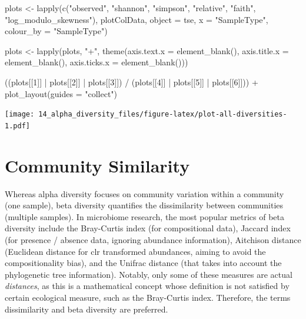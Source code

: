 \documentclass[
]{book}
\newenvironment{Shaded}{\begin{snugshade}}{\end{snugshade}}
\newcommand{\AttributeTok}[1]{\textcolor[rgb]{0.77,0.63,0.00}{#1}}
\newcommand{\DecValTok}[1]{\textcolor[rgb]{0.00,0.00,0.81}{#1}}
\newcommand{\FunctionTok}[1]{\textcolor[rgb]{0.00,0.00,0.00}{#1}}
\newcommand{\NormalTok}[1]{#1}
\newcommand{\OtherTok}[1]{\textcolor[rgb]{0.56,0.35,0.01}{#1}}
\newcommand{\SpecialCharTok}[1]{\textcolor[rgb]{0.00,0.00,0.00}{#1}}
\newcommand{\StringTok}[1]{\textcolor[rgb]{0.31,0.60,0.02}{#1}}
\begin{document}
\begin{Shaded}
\begin{Highlighting}[]
\NormalTok{plots }\OtherTok{\textless{}{-}} \FunctionTok{lapply}\NormalTok{(}\FunctionTok{c}\NormalTok{(}\StringTok{"observed"}\NormalTok{, }\StringTok{"shannon"}\NormalTok{, }\StringTok{"simpson"}\NormalTok{, }\StringTok{"relative"}\NormalTok{, }\StringTok{"faith"}\NormalTok{, }\StringTok{"log\_modulo\_skewness"}\NormalTok{),}
\NormalTok{                plotColData,}
                \AttributeTok{object =}\NormalTok{ tse,}
                \AttributeTok{x =} \StringTok{"SampleType"}\NormalTok{,}
                \AttributeTok{colour\_by =} \StringTok{"SampleType"}\NormalTok{)}

\NormalTok{plots }\OtherTok{\textless{}{-}} \FunctionTok{lapply}\NormalTok{(plots, }\StringTok{"+"}\NormalTok{, }
                \FunctionTok{theme}\NormalTok{(}\AttributeTok{axis.text.x =} \FunctionTok{element\_blank}\NormalTok{(),}
                      \AttributeTok{axis.title.x =} \FunctionTok{element\_blank}\NormalTok{(),}
                      \AttributeTok{axis.ticks.x =} \FunctionTok{element\_blank}\NormalTok{()))}

\NormalTok{((plots[[}\DecValTok{1}\NormalTok{]] }\SpecialCharTok{|}\NormalTok{ plots[[}\DecValTok{2}\NormalTok{]] }\SpecialCharTok{|}\NormalTok{ plots[[}\DecValTok{3}\NormalTok{]]) }\SpecialCharTok{/} 
\NormalTok{(plots[[}\DecValTok{4}\NormalTok{]] }\SpecialCharTok{|}\NormalTok{ plots[[}\DecValTok{5}\NormalTok{]] }\SpecialCharTok{|}\NormalTok{ plots[[}\DecValTok{6}\NormalTok{]])) }\SpecialCharTok{+}
  \FunctionTok{plot\_layout}\NormalTok{(}\AttributeTok{guides =} \StringTok{"collect"}\NormalTok{)}
\end{Highlighting}
\end{Shaded}

\texttt{[image: 14\_alpha\_diversity\_files/figure-latex/plot-all-diversities-1.pdf]}

\hypertarget{community-similarity}{%
\chapter{Community Similarity}\label{community-similarity}}

Whereas alpha diversity focuses on community variation within a community
(one sample), beta diversity quantifies the dissimilarity between communities
(multiple samples). In microbiome research, the most popular metrics of beta
diversity include the Bray-Curtis index (for compositional data), Jaccard index
(for presence / absence data, ignoring abundance information), Aitchison distance
(Euclidean distance for clr transformed abundances, aiming to avoid the
compositionality bias), and the Unifrac distance (that takes into account the
phylogenetic tree information). Notably, only some of these measures are actual
\emph{distances}, as this is a mathematical concept whose definition is not satisfied
by certain ecological measure, such as the Bray-Curtis index. Therefore, the terms
dissimilarity and beta diversity are preferred.
\end{document}
